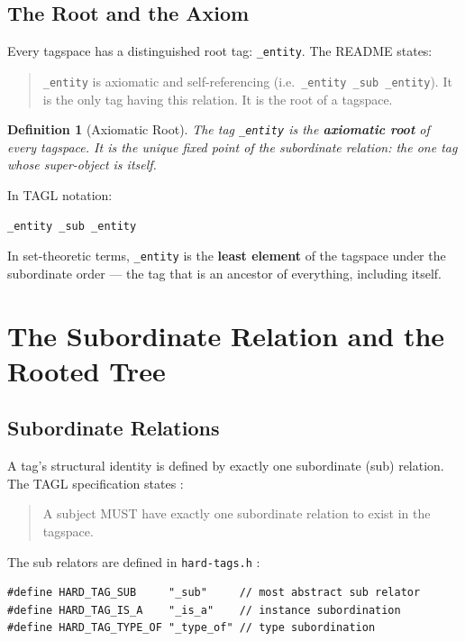 \documentclass{article}
\newtheorem{definition}{Definition}[section]
\begin{document}
\subsection{The Root and the Axiom}

Every tagspace has a distinguished root tag: \texttt{\_entity}. The README
states:
\begin{quote}
\texttt{\_entity} is axiomatic and self-referencing
(i.e.\ \texttt{\_entity \_sub \_entity}). It is the only tag having this
relation. It is the root of a tagspace.
\end{quote}

\begin{definition}[Axiomatic Root]
The tag \texttt{\_entity} is the \textbf{axiomatic root} of every tagspace. It
is the unique fixed point of the subordinate relation: the one tag whose
super-object is itself.
\end{definition}

In TAGL notation:
\begin{lstlisting}[style=tagl, caption={The axiomatic root}]
_entity _sub _entity
\end{lstlisting}

In set-theoretic terms, \texttt{\_entity} is the \textbf{least element} of the
tagspace under the subordinate order --- the tag that is an ancestor of
everything, including itself.

\section{The Subordinate Relation and the Rooted Tree}

\subsection{Subordinate Relations}

A tag's structural identity is defined by exactly one subordinate (sub)
relation. The TAGL specification states \cite{spec}:
\begin{quote}
A subject MUST have exactly one subordinate relation to exist in the tagspace.
\end{quote}

The sub relators are defined in \texttt{hard-tags.h} \cite{hardtags}:
\begin{lstlisting}[style=cpp, caption={Sub relator definitions in hard-tags.h}]
#define HARD_TAG_SUB     "_sub"     // most abstract sub relator
#define HARD_TAG_IS_A    "_is_a"    // instance subordination
#define HARD_TAG_TYPE_OF "_type_of" // type subordination
\end{lstlisting}
\end{document}
